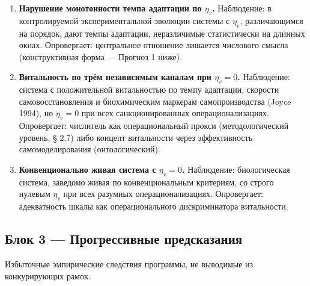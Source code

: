 \documentclass[pdflatex,sn-mathphys-ay]{sn-jnl}
\providecommand{\tightlist}{\setlength{\itemsep}{0pt}\setlength{\parskip}{0pt}}
\begin{document}
\begin{enumerate}
\def\labelenumi{\arabic{enumi}.}
\tightlist
\item
  \textbf{Нарушение монотонности темпа адаптации по \(\eta_v\).} Наблюдение: в контролируемой экспериментальной эволюции системы с \(\eta_v\), различающимся на порядок, дают темпы адаптации, неразличимые статистически на длинных окнах. Опровергает: центральное отношение лишается числового смысла (конструктивная форма --- Прогноз 1 ниже).
\item
  \textbf{Витальность по трём независимым каналам при \(\eta_v = 0\).} Наблюдение: система с положительной витальностью по темпу адаптации, скорости самовосстановления и биохимическим маркерам самопроизводства (Joyce 1994), но \(\eta_v = 0\) при всех санкционированных операционализациях. Опровергает: числитель как операциональный прокси (методологический уровень, § 2.7) либо концепт витальности через эффективность самомоделирования (онтологический).
\item
  \textbf{Конвенционально живая система с \(\eta_v = 0\).} Наблюдение: биологическая система, заведомо живая по конвенциональным критериям, со строго нулевым \(\eta_v\) при всех разумных операционализациях. Опровергает: адекватность шкалы как операционального дискриминатора витальности.
\end{enumerate}

\subsection{Блок 3 --- Прогрессивные предсказания}\label{ux431ux43bux43eux43a-3-ux43fux440ux43eux433ux440ux435ux441ux441ux438ux432ux43dux44bux435-ux43fux440ux435ux434ux441ux43aux430ux437ux430ux43dux438ux44f}

Избыточные эмпирические следствия программы, не выводимые из конкурирующих рамок.
\end{document}
